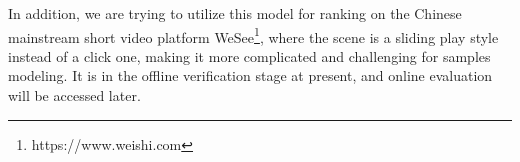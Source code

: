 \documentclass[sigconf]{acmart}
\begin{document}
In addition, we are trying to utilize this model for ranking on the Chinese mainstream short video platform WeSee\footnote{https://www.weishi.com}, where the scene is a sliding play style instead of a click one, making it more complicated and challenging for samples modeling. It is in the offline verification stage at present, and online evaluation will be accessed later.

\balance  












\end{document}
